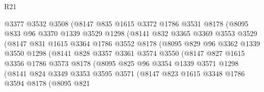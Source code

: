\begin{lexlean}{R21}
\begin{coremodule}
                    @3377
                    @3532
                    @3508
                    (@8147
                      @835
                      @1615
                      @3372
                      @1786
                      @3531
                      @8178
                      (@8095
                        @833
                        @96
                        @3370
                        @1339
                        @3529
                        @1298
                        (@8141
                          @832
                          @3365
                          @3369
                          @3553
                          @3529
                          (@8147
                            @831
                            @1615
                            @3364
                            @1786
                            @3552
                            @8178
                            (@8095
                              @829
                              @96
                              @3362
                              @1339
                              @3550
                              @1298
                              (@8141
                                @828
                                @3357
                                @3361
                                @3574
                                @3550
                                (@8147
                                  @827
                                  @1615
                                  @3356
                                  @1786
                                  @3573
                                  @8178
                                  (@8095
                                    @825
                                    @96
                                    @3354
                                    @1339
                                    @3571
                                    @1298
                                    (@8141
                                      @824
                                      @3349
                                      @3353
                                      @3595
                                      @3571
                                      (@8147
                                        @823
                                        @1615
                                        @3348
                                        @1786
                                        @3594
                                        @8178
                                        (@8095
                                          @821

\end{coremodule}
\end{lexlean}
